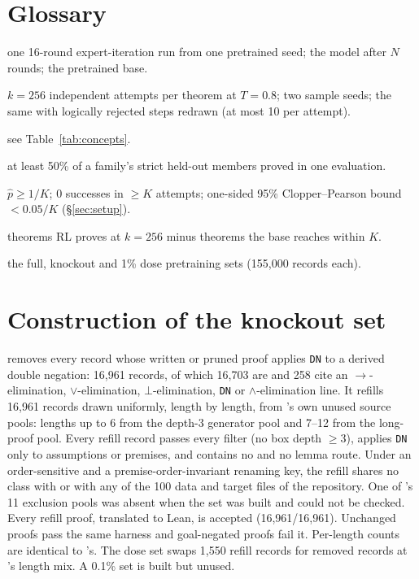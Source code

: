\section{Glossary}
\label{app:glossary}
\begin{description}[leftmargin=1.2em,style=nextline]
\item[ladder; r$N$; r0] one 16-round expert-iteration run from one pretrained seed; the model after $N$ rounds; the
pretrained base.
\item[evaluation; x0, x1; guided] $k=256$ independent attempts per theorem at $T=0.8$; two sample seeds; the same with
logically rejected steps redrawn (at most 10 per attempt).
\item[\sig, \sigp, lemma route, free positive reductio, classical-only, strict] see Table~\ref{tab:concepts}.
\item[acquired] at least 50\% of a family's strict held-out members proved in one evaluation.
\item[within reach / not reached / certified at $K$] $\hat p \geq 1/K$; 0 successes in $\geq K$ attempts; one-sided
95\% Clopper--Pearson bound $< 0.05/K$ (\S\ref{sec:setup}).
\item[\dcov] theorems RL proves at $k=256$ minus theorems the base reaches within $K$.
\item[\KT, \KTko, \KTdose] the full, knockout and 1\% dose pretraining sets (155,000 records each).
\end{description}

\section{Construction of the knockout set}
\label{app:k12ko}
\KTko{} removes every \KT{} record whose written or pruned proof applies \texttt{DN} to a derived double negation:
16,961 records, of which 16,703 are \sig{} and 258 cite an $\to$-elimination, $\lor$-elimination, $\bot$-elimination,
\texttt{DN} or $\land$-elimination line. It refills 16,961 records drawn uniformly, length by length, from \KT{}'s own
unused source pools: lengths up to 6 from the depth-3 generator pool and 7--12 from the long-proof pool. Every refill
record passes every \KT{} filter (no box depth $\geq 3$), applies \texttt{DN} only to assumptions or premises, and
contains no \sigp{} and no lemma route. Under an order-sensitive and a premise-order-invariant renaming key, the refill shares no
class with \KT{} or with any of the 100 data and target files of the repository. One of \KT{}'s 11 exclusion pools was
absent when the set was built and could not be checked. Every refill proof, translated to Lean, is accepted
(16,961/16,961). Unchanged proofs pass the same harness and goal-negated proofs fail it. Per-length counts are identical
to \KT{}'s. The dose set \KTdose{} swaps 1,550 refill records for removed \sig{} records at \KT{}'s \sig{} length mix.
A 0.1\% set is built but unused.

